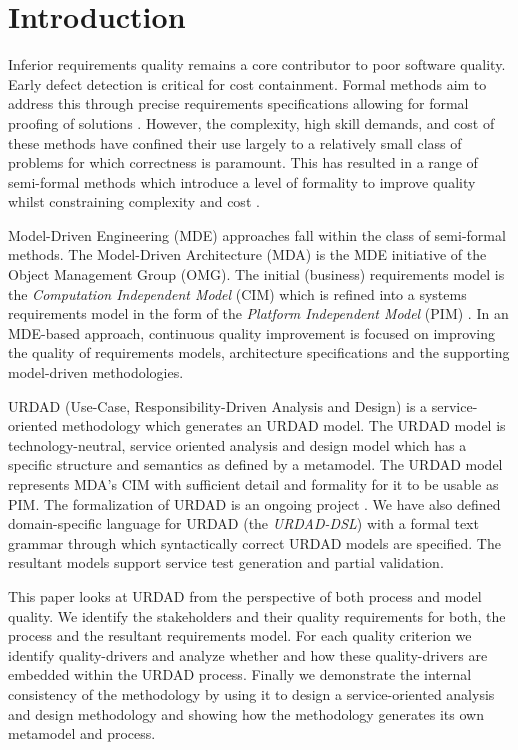 \section{Introduction}
\label{sec:Introduction}

Inferior requirements quality remains a core contributor to poor software quality\cite{heck_experiences_2008}. Early defect detection is critical for cost containment\cite{biffl_software_2000}. Formal methods aim to address this through precise requirements specifications allowing for formal proofing of solutions \cite{hinchey_software_2008}. However, the complexity, high skill demands, and cost of these methods have confined their use largely to a relatively small class of problems for which correctness is paramount. This has resulted in a range of semi-formal methods which introduce a level of formality to improve quality whilst constraining complexity and cost \cite{razali_usability_2008}.

Model-Driven Engineering (MDE) \cite{frankel_model_2003} approaches fall within the class of semi-formal methods. The Model-Driven Architecture (MDA) is the MDE initiative of the Object Management Group (OMG). The initial (business) requirements model is the \emph{Computation Independent Model} (CIM) which is refined into a systems requirements model in the form of the \emph{Platform Independent Model} (PIM) \cite{_mda_2003}. In an MDE-based approach, continuous quality improvement is focused on improving the quality of requirements models, architecture specifications and the supporting model-driven methodologies.

URDAD (Use-Case, Responsibility-Driven Analysis and Design) \cite{solms_technology_2007} is a service-oriented methodology which generates an URDAD model. The URDAD model is technology-neutral, service oriented analysis and design model which has a specific structure and semantics as defined by a metamodel. The URDAD model represents MDA's CIM \cite{solms_generating_2009} with sufficient detail and formality for it to be usable as PIM. The formalization of URDAD is an ongoing project \cite{solms_urdad_2010}. We have also defined domain-specific language for URDAD (the \emph{URDAD-DSL}) with a formal text grammar through which syntactically correct URDAD models are specified. The resultant models support service test generation and partial validation.

This paper looks at URDAD from the perspective of both process and model quality. We identify the stakeholders and their quality requirements for both, the process and the resultant requirements model. For each quality criterion we identify quality-drivers and analyze whether and how these quality-drivers are embedded within the URDAD process. Finally we demonstrate the internal consistency of the methodology by using it to design a service-oriented analysis and design methodology and showing how the methodology generates its own metamodel and process.
